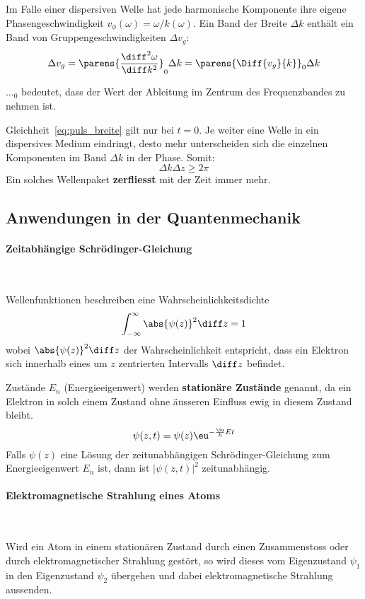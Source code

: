 		Im Falle einer dispersiven Welle hat jede harmonische Komponente ihre eigene Phasengeschwindigkeit $v_\phi(\omega) = \omega/k(\omega)$. Ein Band der Breite $\Delta k$ enthält ein Band von Gruppengeschwindigkeiten $\Delta v_g$:
		\[
			\Delta v_g = \parens{\frac{\diff^2 \omega}{\diff k^2}}_0 \Delta k
				= \parens{\Diff{v_g}{k}}_0 \Delta k
		\]
		
		$\dots_0$ bedeutet, dass der Wert der Ableitung im Zentrum des Frequenzbandes zu nehmen ist.
		
		Gleichheit~\eqref{eq:puls_breite} gilt nur bei $t=0$. Je weiter eine Welle in ein dispersives Medium eindringt, desto mehr unterscheiden sich die einzelnen Komponenten im Band $\Delta k$ in der Phase. Somit:
		\[
			\Delta k \Delta z \ge 2\pi
		\]
		Ein solches Wellenpaket \textbf{zerfliesst} mit der Zeit immer mehr.
	\subsection{Anwendungen in der Quantenmechanik} %
		\paragraph{Zeitabhängige Schrödinger-Gleichung} %
			~

			Wellenfunktionen beschreiben eine Wahrscheinlichkeitsdichte
			\[
				\int_{-\infty}^\infty \abs{\psi(z)}^2 \diff z = 1
			\]
			wobei $\abs{\psi(z)}^2 \diff z$ der Wahrscheinlichkeit entspricht, dass
			ein Elektron sich innerhalb eines um $z$ zentrierten Intervalls $\diff z$
			befindet.
			
			Zustände $E_n$ (Energieeigenwert) werden \textbf{stationäre Zustände} genannt, da ein Elektron in solch einem Zustand ohne äusseren Einfluss ewig in diesem Zustand bleibt.
			\[
				\psi(z,t) = \psi(z) \eu^{- \frac{\iu}{\hbar} Et}
			\]
			Falls $\psi(z)$ eine Lösung der zeitunabhängigen Schrödinger-Gleichung zum Energieeigenwert $E_n$ ist, dann ist $|\psi(z,t)|^2$ zeitunabhängig.
		\paragraph{Elektromagnetische Strahlung eines Atoms} %
			~
			
			Wird ein Atom in einem stationären Zustand durch einen Zusammenstoss oder durch elektromagnetischer Strahlung gestört, so wird dieses vom Eigenzustand $\psi_1$ in den Eigenzustand $\psi_2$ übergehen und dabei elektromagnetische Strahlung aussenden.
			

